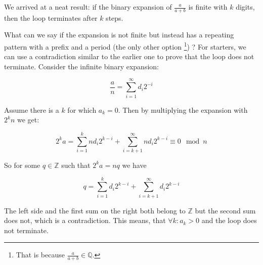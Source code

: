 We arrived at a neat result: if the binary expansion of $\frac{a}{a+b}$ is finite with $k$ digits, then the loop terminates after $k$ steps.

What can we say if the expansion is not finite but instead has a repeating pattern with a prefix and a period (the only other option \footnote{That is because $\frac{a}{a+b} \in \mathbb{Q}$.}) ? For starters, we can use a contradiction similar to the earlier one to prove that the loop does not terminate. Consider the infinite binary expansion:

$$
  \frac{a}{n} = \sum_{i = 1}^\infty d_i 2^{-i}
$$

Assume there is a $k$ for which $a_k = 0$. Then by multiplying the expansion with $2^k n$ we get:

$$
  2^k a = \sum_{i = 1}^k n d_i 2^{k-i} + \sum_{i = k+1}^\infty n d_i 2^{k-i} \equiv 0 \mod n
$$

So for some $q \in \mathbb{Z}$ such that $2^k a = n q$ we have

$$
  q = \sum_{i = 1}^k d_i 2^{k-i} + \sum_{i = k+1}^\infty d_i 2^{k-i}
$$

The left side and the first sum on the right both belong to $\mathbb{Z}$ but the second sum does not, which is a contradiction. This means, that $\forall k: a_k > 0$ and the loop does not terminate.






